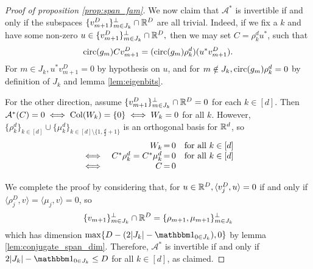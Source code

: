 \begin{proof}[Proof of proposition \ref{prop:span_fam}]
  We now claim that $\mathcal{A}^*$ is invertible if and only if the subspaces $\{v_{m + 1}^D\}_{m \in J_k}^\perp \cap \mathbb{R}^D$ are all trivial.  Indeed, if we fix a $k$ and have some non-zero $u \in \{v_{m + 1}^D\}_{m \in J_k}^\perp \cap \mathbb{R}^D,$ then we may set $C = \rho_k^d u^*$, such that \[\operatorname{circ}(g_m) C v_{m + 1}^D = (\operatorname{circ}(g_m) \rho_k^d) (u^* v_{m + 1}^D).\]  For $m \in J_k, u^* v_{m + 1}^D = 0$ by hypothesis on $u$, and for $m \notin J_k, \operatorname{circ}(g_m) \rho_k^d = 0$ by definition of $J_k$ and lemma \ref{lem:eigenbits}.

  For the other direction, assume $\{v_{m + 1}^D\}_{m \in J_k}^\perp \cap \mathbb{R}^D = 0$ for each $k \in [d]$.  Then $\mathcal{A}^*(C) = 0 \iff \operatorname{Col}(W_k) = \{0\} \iff W_k = 0$ for all $k$.  However, $\{\rho_k^d\}_{k \in [d]} \cup \{\mu_k^d\}_{k \in [d] \setminus \{1, \frac{d}{2} + 1\}}$ is an orthogonal basis for $\mathbb{R}^d$, so \[\begin{array}{cr@{\,=\,}lr} & W_k & 0 & \text{for all} \ k \in [d] \\ \iff & C^* \rho_k^d = C^* \mu_k^d & 0 & \text{for all} \ k \in [d] \\ \iff & C & 0 & \end{array}\]


  We complete the proof by considering that, for $u \in \mathbb{R}^{D}, \langle v_j^D, u \rangle = 0$ if and only if $\langle \rho_j^D, v \rangle = \langle \mu_j, v \rangle = 0$, so \[\{v_{m + 1}\}_{m \in J_k}^\perp \cap \mathbb{R}^{D} = \{\rho_{m + 1}, \mu_{m + 1}\}_{m \in J_k}^\perp\] which has dimension $\max\{D - (2|J_k| - \one_{0 \in J_k}), 0\}$ by lemma \ref{lem:conjugate_span_dim}.  Therefore, $\mathcal{A}^*$ is invertible if and only if $2|J_k| - \one_{0 \in J_k} \le D$ for all $k \in [d]$, as claimed.
\end{proof}

